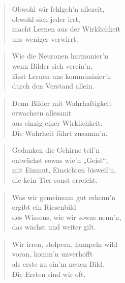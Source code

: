 \documentclass[10pt,a4paper]{article}
\begin{document}
\begin{multicols}{2}
\begin{verse}
Obwohl wir fehlgeh’n allezeit, \\
obwohl sich jeder irrt, \\
macht Lernen aus der Wirklichkeit \\
uns weniger verwirrt. \\
\end{verse}

\begin{verse}
Wie die Neuronen harmonier’n \\
wenn Bilder sich verein’n, \\
lässt Lernen uns kommunizier’n \\
durch den Verstand allein. \\
\end{verse}

\begin{verse}
Denn Bilder mit Wahrhaftigkeit \\
erwachsen allesamt \\
aus einzig einer Wirklichkeit. \\
Die Wahrheit führt zusamm’n. \\
\end{verse}

\begin{verse}
Gedanken die Gehirne teil’n \\
entwächst sowas wie’n „Geist“, \\
mit Einmut, Einsichten bisweil’n, \\
die kein Tier sonst erreicht. \\
\end{verse}

\begin{verse}
Was wir gemeinsam gut erkenn’n \\
ergibt ein Riesenbild \\
des Wissens, wie wir sowas nenn’n, \\
das wächst und weiter gilt. \\
\end{verse}

\begin{verse}
Wir irren, stolpern, humpeln wild \\
voran, komm’n unverhofft \\
als erste zu ein’m neuen Bild. \\
Die Ersten sind wir oft. \\
\end{verse}


\end{multicols}
\end{document}
